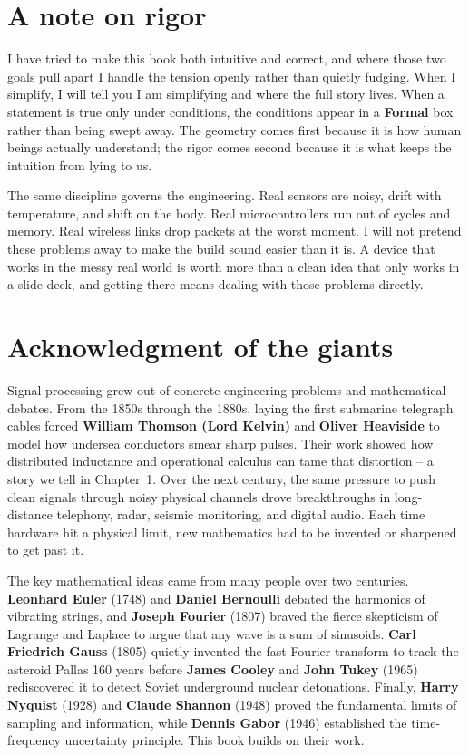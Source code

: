 \section*{A note on rigor}

I have tried to make this book both intuitive and correct, and where those two goals pull
apart I handle the tension openly rather than quietly fudging. When I simplify, I will tell
you I am simplifying and where the full story lives. When a statement is true only under
conditions, the conditions appear in a \textbf{Formal} box rather than being swept away. The
geometry comes first because it is how human beings actually understand; the rigor comes
second because it is what keeps the intuition from lying to us.

The same discipline governs the engineering. Real sensors are noisy, drift with temperature,
and shift on the body. Real microcontrollers run out of cycles and memory. Real wireless
links drop packets at the worst moment. I will not pretend these problems away to make the
build sound easier than it is. A device that works in the messy real world is worth more than
a clean idea that only works in a slide deck, and getting there means dealing with those problems directly.

\section*{Acknowledgment of the giants}

\begin{historybox}
Signal processing grew out of concrete engineering problems and mathematical
debates. From the 1850s through the 1880s, laying the first
submarine telegraph cables forced \textbf{William Thomson (Lord Kelvin)} and \textbf{Oliver
Heaviside} to model how undersea conductors smear sharp pulses. Their work showed how distributed inductance
and operational calculus can tame that distortion -- a story we tell in Chapter~1. Over the
next century, the same pressure to push clean signals through noisy physical channels drove
breakthroughs in long-distance telephony, radar, seismic monitoring, and digital audio. Each
time hardware hit a physical limit, new mathematics had to be invented or sharpened to get past
it.

The key mathematical ideas came from many people over two centuries.
\textbf{Leonhard Euler} (1748) and \textbf{Daniel Bernoulli} debated the harmonics of vibrating
strings, and \textbf{Joseph Fourier} (1807) braved the fierce skepticism of Lagrange and Laplace to
argue that any wave is a sum of sinusoids. \textbf{Carl Friedrich Gauss} (1805) quietly invented
the fast Fourier transform to track the asteroid Pallas 160 years before \textbf{James Cooley}
and \textbf{John Tukey} (1965) rediscovered it to detect Soviet underground nuclear detonations.
Finally, \textbf{Harry Nyquist} (1928) and \textbf{Claude Shannon} (1948) proved the fundamental limits of
sampling and information, while \textbf{Dennis Gabor} (1946) established the
time-frequency uncertainty principle. This book builds on their work.
\end{historybox}

